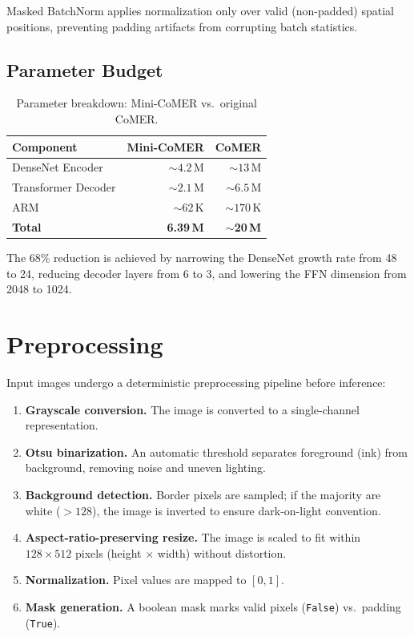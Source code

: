 \documentclass[11pt,a4paper]{article}
\begin{document}
Masked BatchNorm applies normalization only over valid (non-padded) spatial positions, preventing padding artifacts from corrupting batch statistics.

\subsection{Parameter Budget}

\begin{table}[H]
\centering
\caption{Parameter breakdown: Mini-CoMER vs.\ original CoMER.}
\label{tab:params}
\begin{tabular}{lrr}
\toprule
\textbf{Component} & \textbf{Mini-CoMER} & \textbf{CoMER} \\
\midrule
DenseNet Encoder   & ${\sim}4.2$\,M & ${\sim}13$\,M \\
Transformer Decoder & ${\sim}2.1$\,M & ${\sim}6.5$\,M \\
ARM                & ${\sim}62$\,K  & ${\sim}170$\,K \\
\midrule
\textbf{Total}     & \textbf{6.39\,M} & \textbf{${\sim}$20\,M} \\
\bottomrule
\end{tabular}
\end{table}

The 68\% reduction is achieved by narrowing the DenseNet growth rate from 48 to 24, reducing decoder layers from 6 to 3, and lowering the FFN dimension from 2048 to 1024.

\section{Preprocessing}
\label{sec:preprocessing}

Input images undergo a deterministic preprocessing pipeline before inference:

\begin{enumerate}[nosep]
  \item \textbf{Grayscale conversion.} The image is converted to a single-channel representation.
  \item \textbf{Otsu binarization.} An automatic threshold separates foreground (ink) from background, removing noise and uneven lighting.
  \item \textbf{Background detection.} Border pixels are sampled; if the majority are white ($> 128$), the image is inverted to ensure dark-on-light convention.
  \item \textbf{Aspect-ratio-preserving resize.} The image is scaled to fit within $128 \times 512$ pixels (height $\times$ width) without distortion.
  \item \textbf{Normalization.} Pixel values are mapped to $[0, 1]$.
  \item \textbf{Mask generation.} A boolean mask marks valid pixels (\texttt{False}) vs.\ padding (\texttt{True}).
\end{enumerate}
\end{document}
